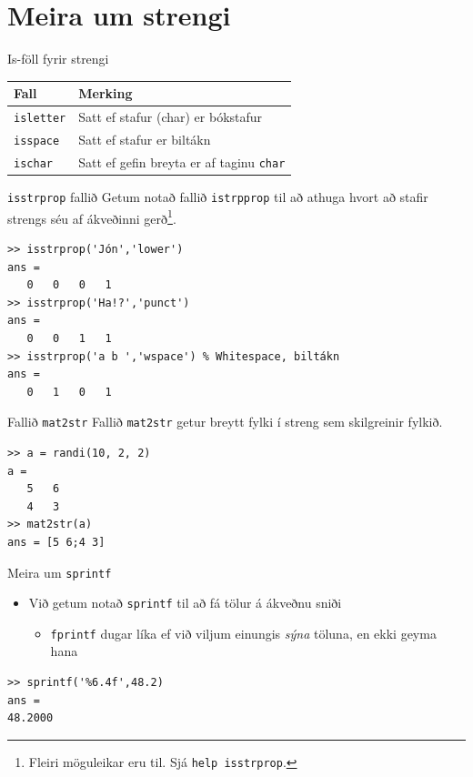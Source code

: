 \documentclass{beamer}
\begin{document}
\section{Meira um strengi}

\begin{frame}[fragile]{Is-föll fyrir strengi}
\begin{center}
\begin{tabular}{ll}
\toprule
Fall&Merking\\
\midrule
\texttt{isletter}&Satt ef stafur (char) er bókstafur\\
\texttt{isspace}&Satt ef stafur er biltákn\\
\texttt{ischar}&Satt ef gefin breyta er af taginu \texttt{char}\\
\bottomrule
\end{tabular}
\end{center}
\end{frame}

\begin{frame}[fragile]{\texttt{isstrprop} fallið}
\vspace{1.5\baselineskip}
Getum notað fallið \texttt{istrpprop} til að athuga hvort að stafir strengs séu af ákveðinni gerð\footnote{Fleiri möguleikar eru til. Sjá \texttt{help isstrprop}.}.
\begin{verbatim}
>> isstrprop('Jón','lower')
ans =
   0   0   0   1
>> isstrprop('Ha!?','punct')
ans =
   0   0   1   1
>> isstrprop('a b ','wspace') % Whitespace, biltákn
ans =
   0   1   0   1
\end{verbatim}
\end{frame}

\begin{frame}[fragile]{Fallið \texttt{mat2str}}
Fallið \texttt{mat2str} getur breytt fylki í streng sem skilgreinir fylkið.
\begin{verbatim}
>> a = randi(10, 2, 2)
a =
   5   6
   4   3
>> mat2str(a)
ans = [5 6;4 3]
\end{verbatim}
\end{frame}

\begin{frame}[fragile]{Meira um \texttt{sprintf}}
\begin{itemize}
 \item Við getum notað \texttt{sprintf} til að fá tölur á ákveðnu sniði
 \begin{itemize}
  \item \texttt{fprintf} dugar líka ef við viljum einungis \emph{sýna} töluna, en ekki geyma hana
 \end{itemize}
\end{itemize}
\begin{verbatim}
>> sprintf('%6.4f',48.2)
ans =
48.2000
\end{verbatim}
\end{frame}
\end{document}
